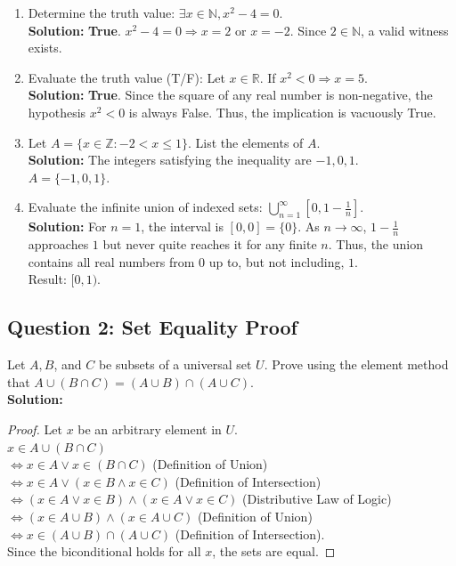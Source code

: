 \documentclass[11pt]{article}
\begin{document}
\begin{enumerate}[label=(\roman*)]
    \item Determine the truth value: $\exists x \in \mathbb{N}, x^2 - 4 = 0$.\\
    \textbf{Solution:} \textbf{True}. $x^2 - 4 = 0 \Rightarrow x = 2$ or $x = -2$. Since $2 \in \mathbb{N}$, a valid witness exists.

    \item Evaluate the truth value (T/F): Let $x \in \mathbb{R}$. If $x^2 < 0 \Rightarrow x = 5$.\\
    \textbf{Solution:} \textbf{True}. Since the square of any real number is non-negative, the hypothesis $x^2 < 0$ is always False. Thus, the implication is vacuously True.

    \item Let $A = \{x \in \mathbb{Z} : -2 < x \leq 1\}$. List the elements of $A$.\\
    \textbf{Solution:} The integers satisfying the inequality are $-1, 0, 1$. \\
    $A = \{-1, 0, 1\}$.

    \item Evaluate the infinite union of indexed sets: $\bigcup_{n=1}^\infty \left[0, 1-\frac{1}{n}\right]$.\\
    \textbf{Solution:} For $n=1$, the interval is $[0, 0] = \{0\}$. As $n \to \infty$, $1 - \frac{1}{n}$ approaches $1$ but never quite reaches it for any finite $n$. Thus, the union contains all real numbers from $0$ up to, but not including, $1$. \\
    Result: $[0, 1)$.
\end{enumerate}

\subsection*{Question 2: Set Equality Proof}
Let $A, B$, and $C$ be subsets of a universal set $U$. Prove using the element method that $A \cup (B \cap C) = (A \cup B) \cap (A \cup C)$.\\
\textbf{Solution:} 
\begin{proof}
Let $x$ be an arbitrary element in $U$. \\
$x \in A \cup (B \cap C)$ \\
$\Leftrightarrow x \in A \vee x \in (B \cap C)$ (Definition of Union) \\
$\Leftrightarrow x \in A \vee (x \in B \wedge x \in C)$ (Definition of Intersection) \\
$\Leftrightarrow (x \in A \vee x \in B) \wedge (x \in A \vee x \in C)$ (Distributive Law of Logic) \\
$\Leftrightarrow (x \in A \cup B) \wedge (x \in A \cup C)$ (Definition of Union) \\
$\Leftrightarrow x \in (A \cup B) \cap (A \cup C)$ (Definition of Intersection). \\
Since the biconditional holds for all $x$, the sets are equal.
\end{proof}
\end{document}
